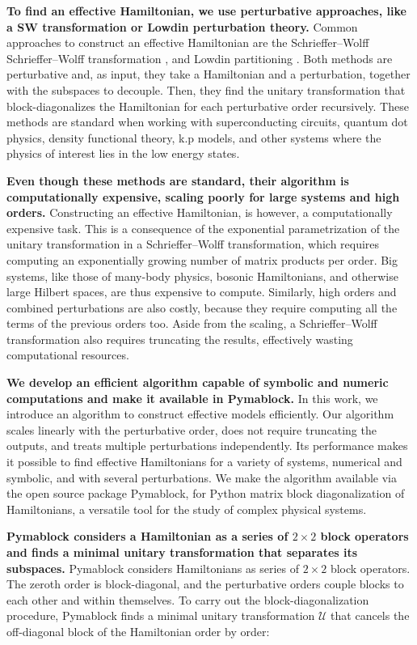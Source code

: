 \documentclass[submission, Codebases]{SciPost}
\begin{document}
{{\textbf{To find an effective Hamiltonian, we use perturbative approaches, like a SW
transformation or Lowdin perturbation theory.}
Common approaches to construct an effective Hamiltonian are the Schrieffer--Wolff
Schrieffer--Wolff transformation
\cite{Schrieffer_1966}, \cite{Bravyi_2011}
and Lowdin partitioning \cite{White_1950}.
Both methods are perturbative and, as input, they take a Hamiltonian and a
perturbation, together with the subspaces to decouple.
Then, they find the unitary transformation that block-diagonalizes the
Hamiltonian for each perturbative order recursively.
These methods are standard when working with superconducting circuits,
quantum dot physics, density functional theory, k.p models, and other
systems where the physics of interest lies in the low energy states.

\textbf{Even though these methods are standard, their algorithm is computationally
expensive, scaling poorly for large systems and high orders.}
Constructing an effective Hamiltonian, is however, a computationally expensive
task.
This is a consequence of the exponential parametrization of the unitary
transformation in a Schrieffer--Wolff transformation, which requires computing
an exponentially growing number of matrix products per order.
Big systems, like those of many-body physics, bosonic Hamiltonians, and
otherwise large Hilbert spaces, are thus expensive to compute.
Similarly, high orders and combined perturbations are also costly, because they
require computing all the terms of the previous orders too.
Aside from the scaling, a Schrieffer--Wolff transformation also requires
truncating the results, effectively wasting computational resources.

\textbf{We develop an efficient algorithm capable of symbolic and numeric
computations and make it available in Pymablock.}
In this work, we introduce an algorithm to construct effective models
efficiently.
Our algorithm scales linearly with the perturbative order, does not require
truncating the outputs, and treats multiple perturbations independently.
Its performance makes it possible to find effective Hamiltonians for a variety
of systems, numerical and symbolic, and with several perturbations.
We make the algorithm available via the open source package Pymablock, for
Python matrix block diagonalization of Hamiltonians, a versatile tool for
the study of complex physical systems.

\textbf{Pymablock considers a Hamiltonian as a series of $2 \times 2$ block operators
and finds a minimal unitary transformation that separates its subspaces.}
Pymablock considers Hamiltonians as series of $2\times 2$ block operators.
The zeroth order is block-diagonal, and the perturbative orders couple
blocks to each other and within themselves.
To carry out the block-diagonalization procedure, Pymablock finds a minimal
unitary transformation $\mathcal{U}$ that cancels the off-diagonal block of the
Hamiltonian order by order:

}}
\end{document}
